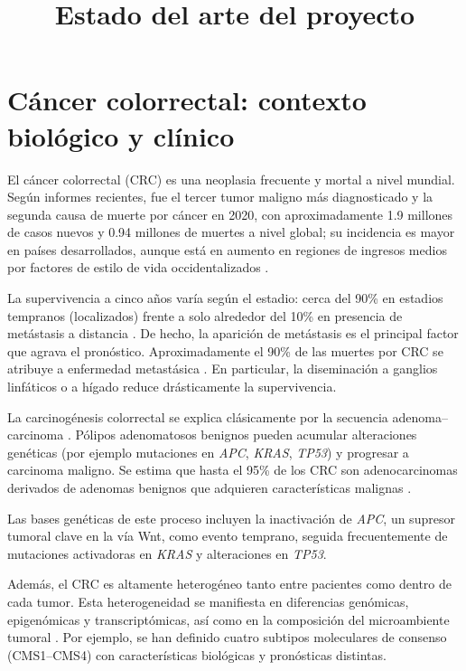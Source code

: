 \documentclass[11pt]{article}
\title{Estado del arte del proyecto}
\author{}
\date{}
\begin{document}
\maketitle
\tableofcontents

\section{Cáncer colorrectal: contexto biológico y clínico}

El cáncer colorrectal (CRC) es una neoplasia frecuente y mortal a nivel mundial. Según informes recientes, fue el tercer tumor maligno más diagnosticado y la segunda causa de muerte por cáncer en 2020, con aproximadamente 1.9 millones de casos nuevos y 0.94 millones de muertes a nivel global; su incidencia es mayor en países desarrollados, aunque está en aumento en regiones de ingresos medios por factores de estilo de vida occidentalizados \cite{ref1,ref2}.

La supervivencia a cinco años varía según el estadio: cerca del 90\% en estadios tempranos (localizados) frente a solo alrededor del 10\% en presencia de metástasis a distancia \cite{ref3}. De hecho, la aparición de metástasis es el principal factor que agrava el pronóstico. Aproximadamente el 90\% de las muertes por CRC se atribuye a enfermedad metastásica \cite{ref3}. En particular, la diseminación a ganglios linfáticos o a hígado reduce drásticamente la supervivencia.

La carcinogénesis colorrectal se explica clásicamente por la secuencia adenoma--carcinoma \cite{ref4}. Pólipos adenomatosos benignos pueden acumular alteraciones genéticas (por ejemplo mutaciones en \textit{APC}, \textit{KRAS}, \textit{TP53}) y progresar a carcinoma maligno. Se estima que hasta el 95\% de los CRC son adenocarcinomas derivados de adenomas benignos que adquieren características malignas \cite{ref4}.

Las bases genéticas de este proceso incluyen la inactivación de \textit{APC}, un supresor tumoral clave en la vía Wnt, como evento temprano, seguida frecuentemente de mutaciones activadoras en \textit{KRAS} y alteraciones en \textit{TP53}.

Además, el CRC es altamente heterogéneo tanto entre pacientes como dentro de cada tumor. Esta heterogeneidad se manifiesta en diferencias genómicas, epigenómicas y transcriptómicas, así como en la composición del microambiente tumoral \cite{ref2}. Por ejemplo, se han definido cuatro subtipos moleculares de consenso (CMS1--CMS4) con características biológicas y pronósticas distintas.
\end{document}
